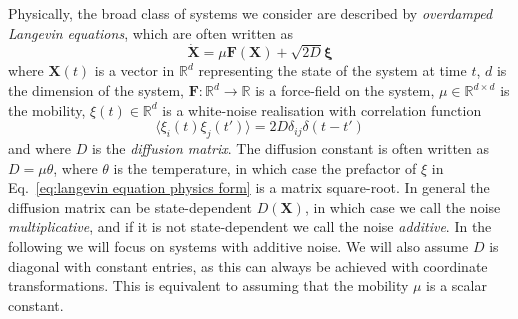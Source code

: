 Physically, the broad class of systems we consider are described by \textit{overdamped Langevin equations}, which are often written as \citep{kampenStochasticProcessesPhysics2011a, riskenFokkerPlanckEquationMethods2012a}
\begin{equation} \label{eq:langevin equation physics form}
\dot{\mathbf{X}} = \mu \mathbf{F}(\mathbf{X}) + \sqrt{2D} \boldsymbol{\xi}
\end{equation}
where $\mathbf{X}(t)$ is a vector in $\mathbb{R}^d$ representing the state of the system at time $t$, $d$ is the dimension of the system, $\mathbf{F} : \mathbb{R}^d \to \mathbb{R}$ is a force-field on the system, $\mu \in \mathbb{R}^{d \times d}$ is the mobility, $\xi(t) \in \mathbb{R}^d$  is a white-noise realisation with correlation function
\begin{equation}
\langle \xi_i(t) \xi_j(t') \rangle = 2 D \delta_{ij} \delta(t - t')
\end{equation}
and where $D$ is the \textit{diffusion matrix}. The diffusion constant is often written as $D = \mu \theta$, where $\theta$ is the temperature, in which case the prefactor of $\xi$ in Eq.~\ref{eq:langevin equation physics form} is a matrix square-root. In general the diffusion matrix can be state-dependent $D(\mathbf{X})$, in which case we call the noise \textit{multiplicative}, and if it is not state-dependent we call the noise \textit{additive}. In the following we will focus on systems with additive noise. We will also assume $D$ is diagonal with constant entries, as this can always be achieved with coordinate transformations. This is equivalent to assuming that the mobility $\mu$ is a scalar constant.

